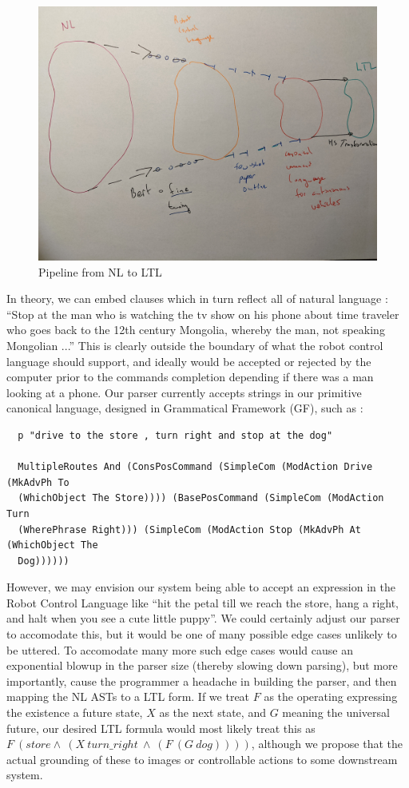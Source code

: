 \documentclass[a4paper, 11pt]{article}
\begin{document}
\begin{figure}
\centering
\includegraphics[width=150mm]{pics/three.jpg}
\caption{Pipeline from NL to LTL}\label{fig:M3}
\end{figure}

In theory, we can embed clauses which in turn reflect all of natural language :
``Stop at the man who is watching the tv show on his phone about time traveler
who goes back to the 12th century Mongolia, whereby the man, not speaking
Mongolian ...'' This is clearly outside the boundary of what the robot control
language should support, and ideally would be accepted or rejected by the
computer prior to the commands completion depending if there was a man looking
at a phone. Our parser currently accepts strings in our primitive canonical
language, designed in Grammatical Framework (GF), such as :

\begin{verbatim}
  p "drive to the store , turn right and stop at the dog"

  MultipleRoutes And (ConsPosCommand (SimpleCom (ModAction Drive (MkAdvPh To
  (WhichObject The Store)))) (BasePosCommand (SimpleCom (ModAction Turn
  (WherePhrase Right))) (SimpleCom (ModAction Stop (MkAdvPh At (WhichObject The
  Dog))))))
\end{verbatim}

However, we may envision our system being able to accept an expression in the
Robot Control Language like ``hit the petal till we reach the store, hang a
right, and halt when you see a cute little puppy''. We could certainly adjust
our parser to accomodate this, but it would be one of many possible edge cases
unlikely to be uttered. To accomodate many more such edge cases would cause an
exponential blowup in the parser size (thereby slowing down parsing), but more
importantly, cause the programmer a headache in building the parser, and then
mapping the NL ASTs to a LTL form. If we treat $F$ as the operating
expressing the existence a future state, $X$ as the next state, and $G$ meaning
the universal future, our desired LTL formula would most likely treat this as
$F\ (store \land\ (X\ turn\_right\ \land\ (F\ (G\ dog))))$, although we propose
that the actual grounding of these to images or controllable actions to some
downstream system.
\end{document}
